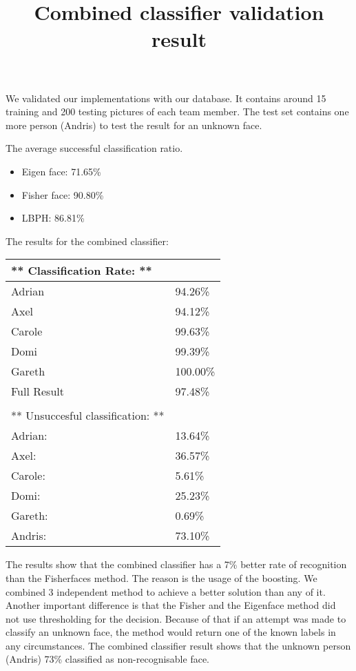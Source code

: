 We validated our implementations with our database. It contains around 15 training and 200 testing pictures of each team member. The test set contains one more person (Andris) to test the result for an unknown face.

The average successful classification ratio.
\begin{itemize}
	\item Eigen face: 71.65\%
	\item Fisher face: 90.80\%
	\item LBPH: 86.81\%
\end{itemize}

The results for the combined classifier:
\begin{table}[h]
	\begin{tabular}{l|l}
		** Classification Rate:                ** &          \\ \hline
		Adrian                                    & 94.26\%  \\
		Axel                                      & 94.12\%  \\
		Carole                                    & 99.63\%  \\
		Domi                                      & 99.39\%  \\
		Gareth                                    & 100.00\% \\ \hline
		Full Result                               & 97.48\%  \\ 
		\\
		** Unsuccesful classification:         ** &          \\ \hline
		Adrian:                                   & 13.64\%  \\
		Axel:                                     & 36.57\%  \\
		Carole:                                   & 5.61\%   \\
		Domi:                                     & 25.23\%  \\
		Gareth:                                   & 0.69\%  \\ \hline
		Andris:                                   & 73.10\%  
	\end{tabular}
	\label{CombinedResult}
	\title{Combined classifier validation result}
\end{table}

The results show that the combined classifier has a 7\% better rate of recognition than the Fisherfaces method. The reason is the usage of the boosting. We combined 3 independent method to achieve a better solution than any of it. Another important difference is that the Fisher and the Eigenface method did not use thresholding for the decision. Because of that if an attempt was made to classify an unknown face, the method would return one of the known labels in any circumstances. The combined classifier result shows that the unknown person (Andris) 73\% classified as non-recognisable face.

